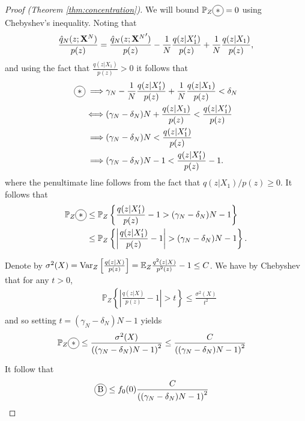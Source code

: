 \begin{proof}[Proof (Theorem \ref{thm:concentration})]
We will bound $\mathbb{P}_Z\encircle{$*$} = 0$ using Chebyshev's inequality.
Noting that 
\begin{align*}
    \frac{\hat{q}_N(z;\mathbf{X}^N)}{p(z)} 
    &= \frac{\hat{q}_N(z;{\mathbf{X}^N}')}{p(z)} - \frac{1}{N}\frac{q(z|X'_1)}{p(z)} + \frac{1}{N}\frac{q(z|X_1)}{p(z)}, \\
\end{align*}
and using the fact that $\frac{q(z|X_1)}{p(z)} > 0$ it follows that
\begin{align*}
    \encircle{$*$} \implies &\gamma_N - \frac{1}{N}\frac{q(z|X'_1)}{p(z)} + \frac{1}{N}\frac{q(z|X_1)}{p(z)} < \delta_N \\
    \iff & (\gamma_N - \delta_N)N + \frac{q(z|X_1)}{p(z)} < \frac{q(z|X'_1)}{p(z)}\\
    \implies & (\gamma_N-\delta_N)N < \frac{q(z|X'_1)}{p(z)}  \\
\implies & (\gamma_N-\delta_N)N - 1 < \frac{q(z|X'_1)}{p(z)} - 1.
\end{align*}
where the penultimate line follows from the fact that $q(z|X_1)/p(z)\geq0$. It follows that
\begin{align*}
    \mathbb{P}_Z\encircle{$*$} &\leq \mathbb{P}_Z\left\lbrace \frac{q(z|X'_1)}{p(z)} - 1 > (\gamma_N-\delta_N)N - 1 \right\rbrace \\
    &\leq \mathbb{P}_Z\left\lbrace \left|\frac{q(z|X'_1)}{p(z)} - 1\right| > (\gamma_N-\delta_N)N - 1 \right\rbrace. \\
\end{align*}

Denote by $\sigma^2(X) = \text{Var}_Z\left[\frac{q(z|X)}{p(z)}\right] = \mathbb{E}_Z \frac{q^2(z|X)}{p^2(z)} - 1 \leq C$.
We have by Chebyshev that for any $t>0$,
\begin{align*}
    &\mathbb{P}_Z\left\lbrace \left|\frac{q(z|X)}{p(z)} - 1\right| > t \right\rbrace \leq \frac{\sigma^2(X)}{t^2} \\
\end{align*}
and so setting $t=(\gamma_N-\delta_N)N - 1$ yields
\begin{align*}
    \mathbb{P}_Z\encircle{$*$} &\leq \frac{\sigma^2(X)}{\left((\gamma_N-\delta_N)N - 1\right)^2} \leq \frac{C}{\left((\gamma_N-\delta_N)N - 1\right)^2}
\end{align*}

It follow that
\begin{align*}
    \encircle{B} &\leq f_0(0) \frac{C}{\left((\gamma_N-\delta_N)N - 1\right)^2}
\end{align*}



\end{proof}
